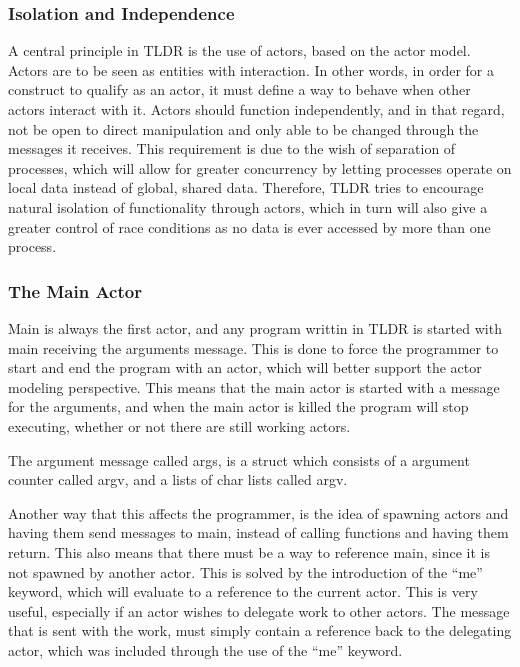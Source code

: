 \subsubsection{Isolation and Independence}

A central principle in TLDR is the use of actors, based on the actor model. Actors are to be seen as entities with interaction. In other words, in order for a construct to qualify as an actor, it must define a way to behave when other actors interact with it. Actors should function independently, and in that regard, not be open to direct manipulation and only able to be changed through the messages it receives. This requirement is due to the wish of separation of processes, which will allow for greater concurrency by letting processes operate on local data instead of global, shared data. Therefore, TLDR tries to encourage natural isolation of functionality through actors, which in turn will also give a greater control of race conditions as no data is ever accessed by more than one process.

\subsubsection{The Main Actor}

Main is always the first actor, and any program writtin in TLDR is started with main receiving the arguments message. This is done to force the programmer to start and end the program with an actor, which will better support the actor modeling perspective. This means that the main actor is started with a message for the arguments, and when the main actor is killed the program will stop executing, whether or not there are still working actors.

The argument message called args, is a struct which consists of a argument counter called argv, and a lists of char lists called argv.

Another way that this affects the programmer, is the idea of spawning actors and having them send messages to main, instead of calling functions and having them return. This also means that there must be a way to reference main, since it is not spawned by another actor. This is solved by the introduction of the \enquote{me} keyword, which will evaluate to a reference to the current actor. This is very useful, especially if an actor wishes to delegate work to other actors. The message that is sent with the work, must simply contain a reference back to the delegating actor, which was included through the use of the \enquote{me} keyword.

